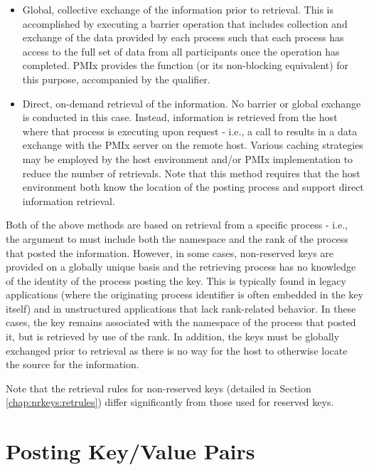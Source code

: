 \begin{itemize}
    \item Global, collective exchange of the information prior to retrieval. This is accomplished by executing a barrier operation that includes collection and exchange of the data provided by each process such that each process has access to the full set of data from all participants once the operation has completed. \ac{PMIx} provides the  function (or its non-blocking equivalent) for this purpose, accompanied by the  qualifier.
    \item Direct, on-demand retrieval of the information. No barrier or global exchange is conducted in this case. Instead, information is retrieved from the host where that process is executing upon request - i.e., a call to  results in a data exchange with the \ac{PMIx} server on the remote host. Various caching strategies may be employed by the host environment and/or \ac{PMIx} implementation to reduce the number of retrievals. Note that this method requires that the host environment both know the location of the posting process and support direct information retrieval.
\end{itemize}

Both of the above methods are based on retrieval from a specific process -
i.e., the  argument to  must include both the
namespace and the rank of the process that posted the information. However, in
some cases, non-reserved keys are provided on a globally unique basis and the
retrieving process has no knowledge of the identity of the process posting the
key. This is typically found in legacy applications (where the originating
process identifier is often embedded in the key itself) and in unstructured
applications that lack rank-related behavior. In these cases, the key remains
associated with the namespace of the process that posted it, but is retrieved
by use of the  rank. In addition, the keys must be
globally exchanged prior to retrieval as there is no way for the host to
otherwise locate the source for the information.

Note that the retrieval rules for non-reserved keys (detailed in Section \ref{chap:nrkeys:retrules}) differ significantly from those used for reserved keys.


\section{Posting Key/Value Pairs}
\label{chap:api_kv_mgmt:set}

